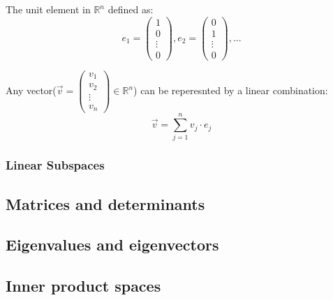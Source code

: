 \documentclass{article}
\newcommand{\R}{\mathbb{R}}
\begin{document}
\begin{definition}
The unit element in $\R^n$ defined as:
\begin{equation*}
	e_1=\begin{pmatrix}
		1\\
		0\\
		\vdots\\
		0
	\end{pmatrix},e_2=\begin{pmatrix}
		0\\
		1\\
		\vdots\\
		0
	\end{pmatrix},...
\end{equation*}
\end{definition}

\begin{theorem}
	Any vector($\vec{v}=\begin{pmatrix}
		v_1\\
		v_2\\
		\vdots\\
		v_n
	\end{pmatrix}\in \R^n$) can be reperesnted by a linear combination:
	\begin{equation*}
		\vec{v}=\sum_{j=1}^n v_j\cdot e_j
	\end{equation*}
\end{theorem}



\subsubsection{Linear Subspaces}








\subsection{Matrices and determinants}





\subsection{Eigenvalues and eigenvectors}




\subsection{Inner product spaces}
\end{document}
